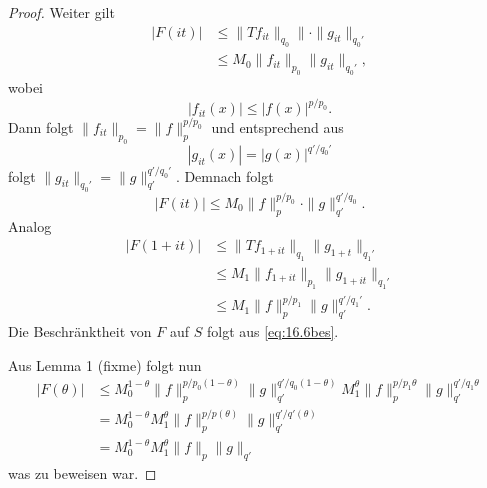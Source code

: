 \documentclass[
paper=a4,
bibtotocnumbered,
liststotocnumbered,
tablecaptionabove,
pointlessnumbers,
twoside,
openright,
10pt
]
{report}
\theoremstyle{definition}
\numberwithin{equation}{chapter}
\begin{document}
\begin{proof}
Weiter gilt
\begin{align*}
|F(it)|&\le \| Tf_{it}\|_{q_0} \|\cdot \|g_{it}\|_{q_0'}\\
&\le M_0 \| f_{it} \|_{p_0} \| g_{it} \|_{q_0'},
\end{align*}
wobei 
\begin{equation}
|f_{it}(x)|\le | f(x)|^{p/p_0}.
\end{equation}
Dann folgt $\| f_{it}\|_{p_0} = \| f\|_p^{p/p_0}$ und entsprechend aus
\begin{equation}
|g_{it}(x)| = |g(x)|^{q'/q_0'}
\end{equation}
folgt  $\| g_{it}\|_{q_0'} = \|g\|_{q'}^{q'/q_0'}$.
Demnach folgt
\begin{equation}
|F(it)|\le M_0 \| f\|_p^{p/p_0} \cdot \| g\|_{q'}^{q'/q_0}.
\end{equation}
Analog
\begin{align*}
|F(1+it)|&\le \| Tf_{1+it} \|_{q_1} \| g_{1+t} \|_{q_1'} \\
&\le M_1 \| f_{1+it} \|_{p_1} \| g_{1+it} \|_{q_1'} \\
&\le M_1\|f\|_p^{p/p_1} \| g\|_{q'}^{q'/q_1'}.
\end{align*}
Die Beschränktheit von $F$ auf $S$ folgt aus \eqref{eq:16.6bes}.  

Aus Lemma 1 (fixme) folgt nun
\begin{align*}
|F(\theta)| &\le M_0^{1-\theta} \| f\|_p^{p/p_0(1-\theta)} \| g\|_{q'} ^{q'/q_0(1-\theta)} M_1^\theta \| f\|_p^{p/p_1 \theta} \| g\|_{q'}^{q'/q_1 \theta}\\
&= M_0^{1-\theta} M_1^\theta \| f\|_p^{p/p(\theta)} \| g\|_{q'}^{q'/q'(\theta)}\\
&= M_0^{1-\theta} M_1^\theta \| f\|_p \| g\|_{q'}
\end{align*} 
was zu beweisen war.
\end{proof}
\end{document}
